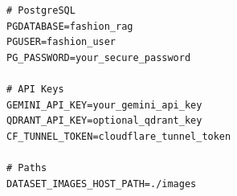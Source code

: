 \begin{lstlisting}[caption={Environment variables (.env)}]
# PostgreSQL
PGDATABASE=fashion_rag
PGUSER=fashion_user
PG_PASSWORD=your_secure_password

# API Keys
GEMINI_API_KEY=your_gemini_api_key
QDRANT_API_KEY=optional_qdrant_key
CF_TUNNEL_TOKEN=cloudflare_tunnel_token

# Paths
DATASET_IMAGES_HOST_PATH=./images
\end{lstlisting}


